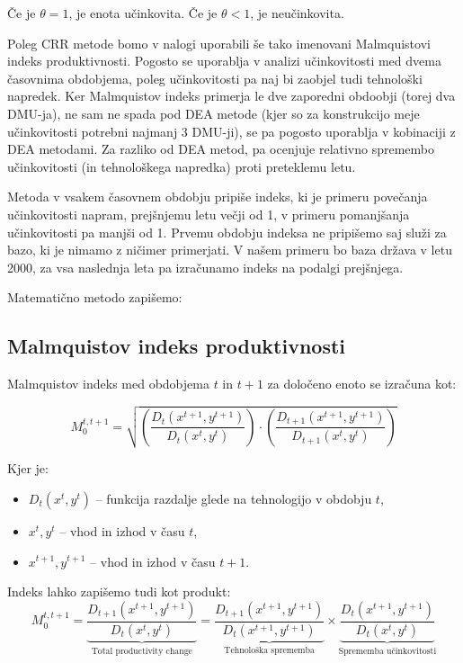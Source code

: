 \documentclass[12pt,a4paper]{article}
\theoremstyle{definition}
\begin{document}
Če je \( \theta = 1 \), je enota učinkovita. Če je \( \theta < 1 \), je neučinkovita.

Poleg CRR metode bomo v nalogi uporabili še tako imenovani Malmquistovi indeks produktivnosti.
Pogosto se uporablja v analizi učinkovitosti med dvema časovnima obdobjema, poleg učinkovitosti
pa naj bi zaobjel tudi tehnološki napredek. Ker Malmquistov indeks
primerja le dve zaporedni obdoobji (torej dva DMU-ja), ne sam ne spada pod DEA metode
(kjer so za konstrukcijo meje učinkovitosti potrebni najmanj 3 DMU-ji), se pa pogosto uporablja
v kobinaciji z DEA metodami. Za razliko od DEA metod, pa ocenjuje relativno spremembo učinkovitosti 
(in tehnološkega napredka) proti preteklemu letu. 

Metoda v vsakem časovnem obdobju pripiše indeks, ki je primeru povečanja učinkovitosti napram,
prejšnjemu letu večji od 1, v primeru pomanjšanja učinkovitosti pa manjši od 1. Prvemu obdobju
indeksa ne pripišemo saj služi za bazo, ki je nimamo z ničimer primerjati. V našem primeru bo baza 
država v letu 2000, za vsa naslednja leta pa izračunamo indeks na podalgi prejšnjega.

Matematično metodo zapišemo:

\subsection{Malmquistov indeks produktivnosti}

Malmquistov indeks med obdobjema \( t \) in \( t+1 \) za določeno enoto se izračuna kot:

\begin{equation*}
M_0^{t,t+1} = \sqrt{
\left( \frac{D_t(x^{t+1}, y^{t+1})}{D_t(x^t, y^t)} \right)
\cdot
\left( \frac{D_{t+1}(x^{t+1}, y^{t+1})}{D_{t+1}(x^t, y^t)} \right)
}
\end{equation*}

Kjer je:
\begin{itemize}
    \item \( D_t(x^t, y^t) \) – funkcija razdalje glede na tehnologijo v obdobju \( t \),
    \item \( x^t, y^t \) – vhod in izhod v času \( t \),
    \item \( x^{t+1}, y^{t+1} \) – vhod in izhod v času \( t+1 \).
\end{itemize}

Indeks lahko zapišemo tudi kot produkt:
\[
M_0^{t,t+1} = \underbrace{\frac{D_{t+1}(x^{t+1}, y^{t+1})}{D_t(x^t, y^t)}}_{\text{Total productivity change}}
= \underbrace{\frac{D_{t+1}(x^{t+1}, y^{t+1})}{D_t(x^{t+1}, y^{t+1})}}_{\text{Tehnološka sprememba}}
\times
\underbrace{\frac{D_t(x^{t+1}, y^{t+1})}{D_t(x^t, y^t)}}_{\text{Sprememba učinkovitosti}}
\]
\end{document}
